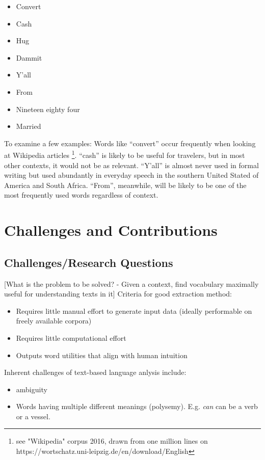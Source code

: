 \begin{itemize}
	\item Convert
	\item Cash
	\item Hug
	\item Dammit
	\item Y'all
	\item From
	\item Nineteen eighty four
	\item Married
\end{itemize}

To examine a few examples: Words like “convert” occur frequently when looking at Wikipedia articles \footnote{see "Wikipedia" corpus 2016, drawn from one million lines on https://wortschatz.uni-leipzig.de/en/download/English}. “cash” is likely to be useful for travelers, but in most other contexts, it would not be as relevant. “Y’all” is almost never used in formal writing but used abundantly in everyday speech in the southern United Stated of America and South Africa. “From”, meanwhile, will be likely to be one of the most frequently used words regardless of context.

\section{Challenges and Contributions}

\subsection{Challenges/Research Questions}
[What is the problem to be solved? - Given a context, find vocabulary maximally useful for understanding texts in it]
Criteria for good extraction method:
\begin{itemize}
	\item Requires little manual effort to generate input data (ideally performable on freely available corpora)
	\item Requires little computational effort
	\item Outputs word utilities that align with human intuition 
\end{itemize}

Inherent challenges of text-based language anlysis include:
\begin{itemize}
	\item ambiguity
	\item Words having multiple different meanings (polysemy). E.g. \textit{can} can be a verb or a vessel.
\end{itemize}

